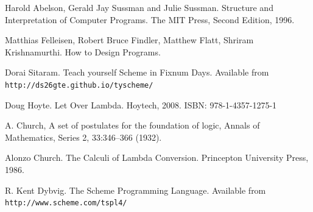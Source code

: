 \documentclass[a4paper,12pt]{book}
\begin{document}
\begin{thebibliography}{99}


 Harold Abelson, Gerald Jay Sussman and
Julie Sussman. Structure and Interpretation of
Computer Programs. The MIT Press, Second Edition, 1996.

 Matthias Felleisen,
Robert Bruce Findler, Matthew Flatt, Shriram Krishnamurthi.
How to Design Programs.

 Dorai Sitaram. Teach yourself Scheme
in Fixnum Days. Available
from \verb|http://ds26gte.github.io/tyscheme/|

 Doug Hoyte. Let Over Lambda. Hoytech, 2008. ISBN: 978-1-4357-1275-1

 A. Church, A set of postulates for the foundation of logic, Annals of Mathematics, Series 2, 33:346–366 (1932).

 Alonzo Church. The Calculi of Lambda Conversion. Princepton University Press, 1986.

 R. Kent Dybvig. The Scheme Programming Language.
Available from \verb|http://www.scheme.com/tspl4/|

\end{thebibliography}

\printindex
\end{document}
